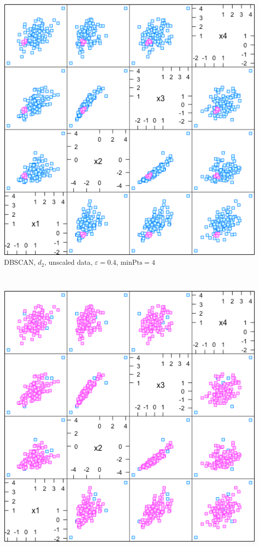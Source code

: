 \documentclass[20pt,landscape,footrule,headrule]{foils}
\begin{document}
{{\newpage \ 
\begin{center}
\includegraphics[height=0.85\textheight]{Images/db_1} \\ 
DBSCAN, $d_2$, unscaled data, $\varepsilon=0.4$, $\text{minPts}=4$
\end{center}
\newpage \ 
\begin{center}
\includegraphics[height=0.85\textheight]{Images/db_2} \\ 

\end{center}}}
\end{document}
